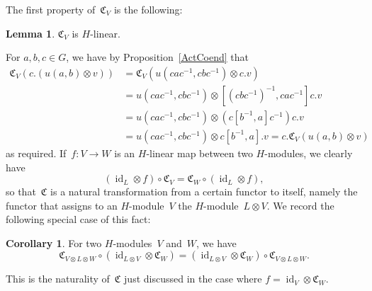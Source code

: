 \documentclass[12pt]{article}
\makeatletter
\theoremstyle{definition}
\newtheorem{Lemma}[Satz]{Lemma}
\newtheorem{Cor}[Satz]{Corollary}
\theoremstyle{break}
\renewenvironment{proof}[1][\proofname]{\par
\vspace{-5pt}%
\pushQED{\qed}%
\normalfont
\topsep0pt \partopsep0pt %
\trivlist
\item[\hskip\labelsep
\bfseries
#1\@addpunct{.}]\ignorespaces
}{%
\popQED\endtrivlist\@endpefalse
\addvspace{6pt plus 6pt} %
}
\DeclareMathOperator\id{id}
\newcommand{\fC}{\mathfrak{C}}
\renewcommand{\1}{\mathbbm{1}}
\newcommand{\ot}{\mathbin{\otimes}}
\newcommand{\uu}{u}
\makeatother
\begin{document}
The first property of~$\fC_V$ is the following:
\begin{Lemma} \label{LinC}
$\fC_V$ is $H$-linear.
\end{Lemma}
\begin{proof}
For $a,b,c \in G$, we have by Proposition~\ref{ActCoend} that
\begin{align*}
\fC_V(c.(\uu(a, b) \ot v)) &= \fC_V(\uu(cac^{-1},cbc^{-1}) \ot c.v) \\
&= \uu(cac^{-1},cbc^{-1}) \ot [(cbc^{-1})^{-1}, cac^{-1}]c.v \\
&= \uu(cac^{-1},cbc^{-1}) \ot (c[b^{-1}, a] c^{-1})c.v \\
&= \uu(cac^{-1},cbc^{-1}) \ot c[b^{-1}, a].v
= c.\fC_V(\uu(a, b) \ot v)
\end{align*}
as required.
\end{proof}
If~$f \colon V \to W$ is an $H$-linear map between two \mbox{$H$-modules}, we clearly have
\[(\id_L \ot f) \circ \fC_V = \fC_W \circ(\id_L \ot f),\]
so that~$\fC$ is a natural transformation from a certain functor to itself, namely the functor that assigns to an $H$-module~$V$ the $H$-module~$L \ot V$. We record the following special case of this fact:
\begin{Cor} \label{CommC}
For two $H$-modules~$V$ and~$W$, we have
\[\fC_{V \ot L \ot W} \circ (\id_{L \ot V} \ot \fC_W) =
(\id_{L \ot V} \ot \fC_W) \circ \fC_{V \ot L \ot W}.\]
\end{Cor}
\begin{proof}
This is the naturality of~$\fC$ just discussed in the case where
$f= \id_{V} \ot \fC_W$.\qedhere
\end{proof}
\end{document}
